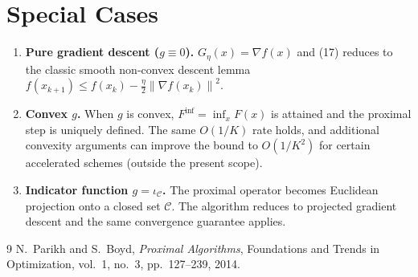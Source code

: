 \documentclass{article}
\newcommand{\grad}{\nabla}
\newcommand{\norm}[1]{\left\lVert #1\right\rVert}
\begin{document}
\section*{Special Cases}
\begin{enumerate}[label=\arabic*.]
    \item \textbf{Pure gradient descent ($g\equiv0$).} $G_{\eta}(x)=\grad f(x)$ and (17) reduces to the classic smooth non‑convex descent lemma $f(x_{k+1})\le f(x_{k})-\frac{\eta}{2}\norm{\grad f(x_{k})}^{2}$.
    \item \textbf{Convex $g$.} When $g$ is convex, $F^{\inf}= \inf_{x}F(x)$ is attained and the proximal step is uniquely defined. The same $O(1/K)$ rate holds, and additional convexity arguments can improve the bound to $O(1/K^{2})$ for certain accelerated schemes (outside the present scope).
    \item \textbf{Indicator function $g=\iota_{\mathcal{C}}$.} The proximal operator becomes Euclidean projection onto a closed set $\mathcal{C}$. The algorithm reduces to projected gradient descent and the same convergence guarantee applies.
\end{enumerate}

\begin{thebibliography}{9}
N.~Parikh and S.~Boyd, \emph{Proximal Algorithms}, Foundations and Trends in Optimization, vol.~1, no.~3, pp.~127–239, 2014.
\end{thebibliography}
\end{document}
